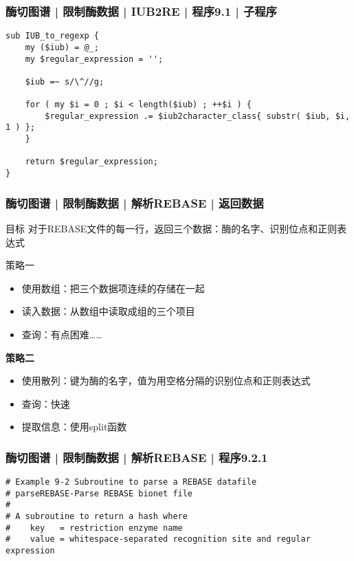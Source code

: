 \begin{frame}[fragile]
  \frametitle{酶切图谱 | 限制酶数据 | IUB2RE | 程序9.1 | \alert{子程序}}
\begin{lstlisting}
sub IUB_to_regexp {
    my ($iub) = @_;
    my $regular_expression = '';

    $iub =~ s/\^//g;

    for ( my $i = 0 ; $i < length($iub) ; ++$i ) {
        $regular_expression .= $iub2character_class{ substr( $iub, $i, 1 ) };
    }

    return $regular_expression;
}
\end{lstlisting}
\end{frame}

\begin{frame}
  \frametitle{酶切图谱 | 限制酶数据 | 解析REBASE | 返回数据}
  \begin{block}{目标}
    对于REBASE文件的每一行，返回三个数据：酶的名字、识别位点和正则表达式
  \end{block}
  \pause
  \begin{block}{策略一}
    \begin{itemize}
      \item 使用数组：把三个数据项连续的存储在一起
      \item 读入数据：从数组中读取成组的三个项目
      \item 查询：有点困难……
    \end{itemize}
  \end{block}
  \pause
  \begin{block}{\textbf{策略二}}
    \begin{itemize}
      \item 使用散列：键为酶的名字，值为用空格分隔的识别位点和正则表达式
      \item 查询：快速
      \item 提取信息：使用split函数
    \end{itemize}
  \end{block}
\end{frame}

\begin{frame}[fragile]
  \frametitle{酶切图谱 | 限制酶数据 | 解析REBASE | 程序9.2.1}
\begin{lstlisting}[firstnumber=1]
# Example 9-2 Subroutine to parse a REBASE datafile
# parseREBASE-Parse REBASE bionet file
#
# A subroutine to return a hash where
#    key   = restriction enzyme name
#    value = whitespace-separated recognition site and regular expression
\end{lstlisting}
\end{frame}

